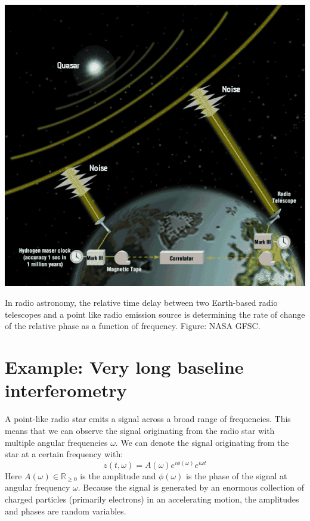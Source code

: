 \begin{marginfigure}
  \begin{center}
    \includegraphics[width=\textwidth]{ch06/figures/vlbi.png}
  \end{center}
  \caption{In radio astronomy, the relative time delay between two Earth-based radio telescopes and a point like radio emission source is determining the rate of change of the relative phase as a function of frequency. Figure: NASA GFSC.}
  \label{fig:vlbi_concept}
\end{marginfigure}

\section{Example: Very long baseline interferometry}
A point-like radio star emits a signal across a broad range of frequencies. This means that we can
observe the signal originating from the radio star with multiple angular frequencies $\omega$.
We can denote the signal originating from the star at a certain frequency with:
\begin{equation}
  z(t,\omega) = A(\omega) e^{i\phi(\omega)} e^{i\omega t}
\end{equation}
Here $A(\omega) \in \mathbb{R}_{\ge 0}$ is the amplitude and $\phi(\omega)$ is the phase of the
signal at angular frequency $\omega$. Because the signal is generated by an enormous collection
of charged particles (primarily electrons) in an accelerating motion,
the amplitudes and phases are random variables.

